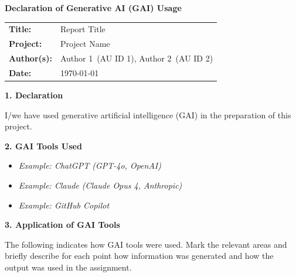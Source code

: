 \documentclass[12pt,a4paper]{article}
\newcommand{\reporttitle}{Report Title}
\newcommand{\projectname}{Project Name}
\newcommand{\authorA}{Author 1}
\newcommand{\authorB}{Author 2}
\newcommand{\studentidA}{AU ID 1}
\newcommand{\studentidB}{AU ID 2}
\begin{document}
\thispagestyle{fancy}

{\large\bfseries Declaration of Generative AI (GAI) Usage\par}

\vspace{0.5cm}

\begin{tabular}{@{}ll}
  \textbf{Title:}      & \reporttitle \\
  \textbf{Project:}    & \projectname \\
  \textbf{Author(s):}  & \authorA\ (\studentidA), \authorB\ (\studentidB) \\
  \textbf{Date:}       & \today \\
\end{tabular}

\vspace{1cm}

{\normalsize\bfseries 1. Declaration\par}
\vspace{2pt}
I/we have used generative artificial intelligence (GAI) in the
preparation of this project.

\vspace{0.5cm}

{\normalsize\bfseries 2. GAI Tools Used\par}
\vspace{2pt}
\begin{itemize}[nosep]
  \item \textit{Example: ChatGPT (GPT-4o, OpenAI)}
  \item \textit{Example: Claude (Claude Opus 4, Anthropic)}
  \item \textit{Example: GitHub Copilot}
\end{itemize}

\vspace{0.5cm}

{\normalsize\bfseries 3. Application of GAI Tools\par}
\vspace{2pt}
The following indicates how GAI tools were used. Mark the relevant
areas and briefly describe for each point how information was
generated and how the output was used in the assignment.

\vspace{0.3cm}
\end{document}
